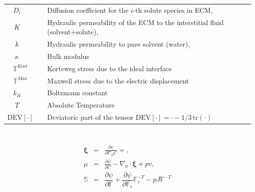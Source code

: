 \documentclass[runningheads]{llncs}
\newcommand{\F}{\ensuremath{\mathbb{F}}}
\begin{document}
\begin{table}[h!]
\begin{tabular}{c  l}
	$D_i\qquad$ & Diffusion coefficient for the $i$-th solute species in ECM,\\
	$K\qquad$ &  Hydraulic permeability of the ECM to the interstitial fluid (solvent+solute),\\
	$k\qquad$ &  Hydraulic  permeability  to  pure  solvent (water),\\
	$\kappa\qquad$ & Bulk modulus\\
	$\mathbb{T}^{Kort}\quad$ & Korteweg stress due to the ideal interface\\
	$\mathbb{T}^{Max}\quad$ & Maxwell stress due to the electric displacement\\
	$k_B\qquad$ & Boltzmann constant\\
	$T\qquad$ & Absolute Temperature \\
	$\text{DEV}\left[\cdot\right]\quad$ & Deviatoric part of the tensor $\text{DEV}\left[\cdot\right] = \cdot-1/3\, \text{tr}(\cdot)$
\end{tabular}	
\end{table}
\section{}
\begin{eqnarray}
\boldsymbol{\xi}&=&\frac{\partial \psi}{\partial \nabla_0 C}=,\\[2mm]
\mu &=& \frac{\partial \psi}{\partial C} - \nabla_0\cdot\boldsymbol{\xi}+ p v,\\[2mm]
\mathbb{S} &=&  \dfrac{\partial \psi}{\partial \F} + \dfrac{\partial \psi}{\partial \F_e}\F_v^{-T}- p J \F^{-T}
\end{eqnarray}
\end{document}
